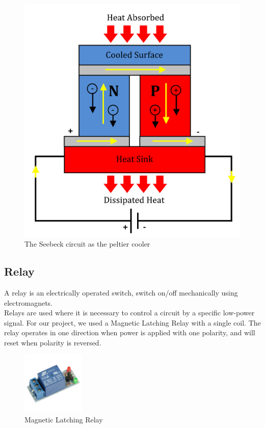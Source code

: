 \documentclass[12pt,onecolumn]{article}
\begin{document}
\begin{figure}[H]
	\centering
	\includegraphics[scale=1.4]{peltier_effect}
	\caption{The Seebeck circuit as the peltier cooler}
\end{figure}


\subsection{Relay}
A relay is an electrically operated switch, switch on/off
mechanically using electromagnets.\\
Relays are used where it is necessary to control a circuit by a specific
low-power signal. For our project, we used a Magnetic Latching Relay
with a single coil. The relay operates in one direction when power is
applied with one polarity, and will reset when polarity is reversed.
\begin{figure}[H]
\centering
\includegraphics[width=3cm]{relay}
\caption{Magnetic Latching Relay}
\end{figure}
\end{document}
